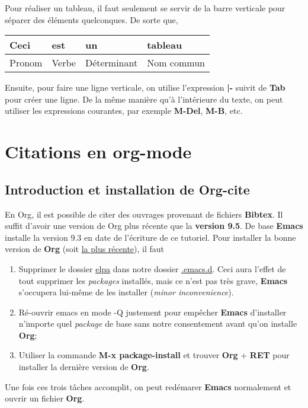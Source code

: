 \documentclass{article}
\numberwithin{equation}{section}
\begin{document}
Pour réaliser un tableau, il faut seulement se servir de la barre verticale pour séparer des éléments quelconques. 
De sorte que,
\begin{center}
\begin{tabular}{llll}
\hline
\hline
\textbf{Ceci} & \textbf{est} & \textbf{un} & \textbf{tableau}\\[0pt]
\hline
Pronom & Verbe & Déterminant & Nom commun\\[0pt]
\hline
\hline
\end{tabular}
\end{center}
Ensuite, pour faire une ligne verticale, on utilise l'expression \textbf{|-} suivit de \textbf{Tab} pour créer une ligne. 
De la même manière qu'à l'intérieure du texte, on peut utiliser les expressions courantes, par exemple \textbf{M-Del}, \textbf{M-B}, etc.

\section{Citations en org-mode}
\label{sec:orga8127fc}
\subsection{Introduction et installation de \textbf{Org-cite}}
\label{sec:org8a30872}
En Org, il est possible de citer des  ouvrages provenant de fichiers \textbf{Bibtex}.
Il suffit d'avoir une version de Org plus récente que la \textbf{version 9.5}.
De base \textbf{Emacs} installe la version 9.3 en date de l'écriture de ce tutoriel.
Pour installer la bonne version de \textbf{Org} (soit \href{https://elpa.gnu.org/packages/org.html}{la plus récente}), il faut
\begin{enumerate}
\item Supprimer le dossier \href{file:///home/charles-edouard/.emacs.d/elta}{elpa} dans notre dossier \href{file:///home/charles-edouard/.emacs.d}{.emacs.d}.
Ceci aura l'effet de tout supprimer les \emph{packages} installés, mais ce n'est pas très grave, \textbf{Emacs} s'occupera lui-même de les installer (\emph{minor inconvenience}).
\item Ré-ouvrir emacs en mode -Q justement pour empêcher \textbf{Emacs} d'installer n'importe quel \emph{package} de base sans notre consentement avant qu'on installe \textbf{Org};
\item Utiliser la commande \textbf{M-x package-install} et trouver \textbf{Org} + \textbf{RET} pour installer la dernière version de \textbf{Org}.
\end{enumerate}
Une fois ces trois tâches accomplit, on peut redémarer \textbf{Emacs} normalement et ouvrir un fichier \textbf{Org}.\\[0pt]
\end{document}
